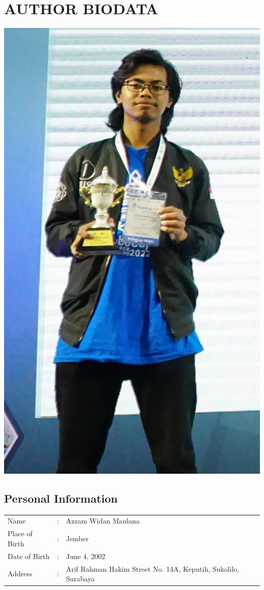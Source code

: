 \chapter*{AUTHOR BIODATA}
\begin{center}
    \includegraphics[height=0.2\textheight]{../ubah/Foto.jpg}
\end{center}

\section*{Personal Information}
\begin{tabular}{p{3cm}cp{9cm}}
    Name             & :& Azzam Widan Maulana \\
    Place of Birth   & :& Jember \\
    Date of Birth    & :& June 4, 2002 \\
    Address          & :& Arif Rahman Hakim Street No. 14A, Keputih, Sukolilo, Surabaya \\
\end{tabular}

